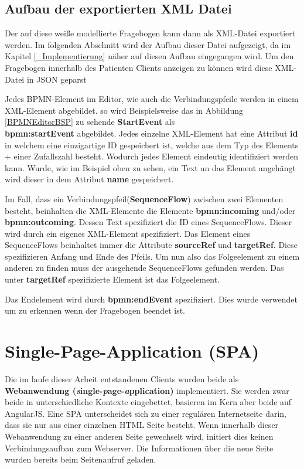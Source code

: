 \subsection{Aufbau der exportierten XML Datei}
Der auf diese weiße modellierte Fragebogen kann dann als XML-Datei exportiert werden. Im folgenden Abschnitt wird der Aufbau dieser Datei aufgezeigt, da im Kapitel \ref{_Implementierung} näher auf diesen Aufbau eingegangen wird. Um den Fragebogen innerhalb des Patienten Clients anzeigen zu können wird diese XML-Datei in JSON geparst

Jedes BPMN-Element im Editor, wie auch die Verbindungspfeile werden in einem XML-Element abgebildet. so wird Beispielsweise das in Abbildung \ref{BPMNEditorBSP} zu sehende \textbf{StartEvent} als \\ \textbf{bpmn:startEvent} abgebildet. Jedes einzelne XML-Element hat eine Attribut \textbf{id} in welchem eine einzigartige ID gespeichert ist, welche aus dem Typ des Elements + einer Zufallszahl besteht. Wodurch jedes Element eindeutig identifiziert werden kann. Wurde, wie im Beispiel oben zu sehen, ein Text an das Element angehängt wird dieser in dem Attribut \textbf{name} gespeichert.

Im Fall, dass ein Verbindungspfeil(\textbf{SequenceFlow}) zwischen zwei Elementen besteht, beinhalten die XML-Elemente die Elemente \textbf{bpmn:incoming} und/oder \textbf{bpmn:outcoming}. Dessen Text spezifiziert die ID eines SequenceFlows. Dieser wird durch ein eigenes XML-Element spezifiziert. Das Element eines SequenceFlows beinhaltet immer die Attribute \textbf{sourceRef} und \textbf{targetRef}. Diese spezifizieren Anfang und Ende des Pfeils. Um nun also das Folgeelement zu einem anderen zu finden muss der ausgehende SequenceFlows gefunden werden. Das unter \textbf{targetRef} spezifizierte Element ist das Folgeelement.

Das Endelement wird durch \textbf{bpmn:endEvent} spezifiziert. Dies wurde verwendet um zu erkennen wenn der Fragebogen beendet ist.

\section{Single-Page-Application (SPA)}\label{Single-Page-Application}
Die im laufe dieser Arbeit entstandenen Clients  wurden beide als \textbf{Webanwendung (\textit{s}ingle-\textit{p}age-\textit{a}pplication)} implementiert. Sie werden zwar beide in unterschiedliche Kontexte eingebettet, basieren im Kern aber beide auf AngularJS. Eine SPA unterscheidet sich zu einer regulären Internetseite darin, dass sie nur aus einer einzelnen HTML Seite besteht. Wenn innerhalb dieser Webanwendung zu einer anderen Seite gewechselt wird, initiert dies keinen Verbindungsaufbau zum Webserver. Die Informationen über die neue Seite wurden bereits beim Seitenaufruf geladen.

